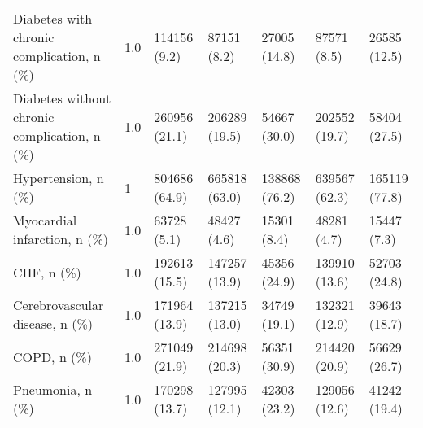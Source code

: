 \begin{tabular}{L{20em}C{10em}C{10em}C{10em}C{10em}C{10em}}
         Diabetes with chronic complication, n (\%) &                                 \hspace{3mm} 1.0 &       114156 (9.2) &                             87151 (8.2) &                        27005 (14.8) &                              87571 (8.5) &                        26585 (12.5) \\
      Diabetes without chronic complication, n (\%) &                                 \hspace{3mm} 1.0 &      260956 (21.1) &                           206289 (19.5) &                        54667 (30.0) &                            202552 (19.7) &                        58404 (27.5) \\
                               Hypertension, n (\%) &                                   \hspace{3mm} 1 &      804686 (64.9) &                           665818 (63.0) &                       138868 (76.2) &                            639567 (62.3) &                       165119 (77.8) \\
                      Myocardial infarction, n (\%) &                                 \hspace{3mm} 1.0 &        63728 (5.1) &                             48427 (4.6) &                         15301 (8.4) &                              48281 (4.7) &                         15447 (7.3) \\
                                        CHF, n (\%) &                                 \hspace{3mm} 1.0 &      192613 (15.5) &                           147257 (13.9) &                        45356 (24.9) &                            139910 (13.6) &                        52703 (24.8) \\
                    Cerebrovascular disease, n (\%) &                                 \hspace{3mm} 1.0 &      171964 (13.9) &                           137215 (13.0) &                        34749 (19.1) &                            132321 (12.9) &                        39643 (18.7) \\
                                       COPD, n (\%) &                                 \hspace{3mm} 1.0 &      271049 (21.9) &                           214698 (20.3) &                        56351 (30.9) &                            214420 (20.9) &                        56629 (26.7) \\
                                  Pneumonia, n (\%) &                                 \hspace{3mm} 1.0 &      170298 (13.7) &                           127995 (12.1) &                        42303 (23.2) &                            129056 (12.6) &                        41242 (19.4) \\

\end{tabular}
